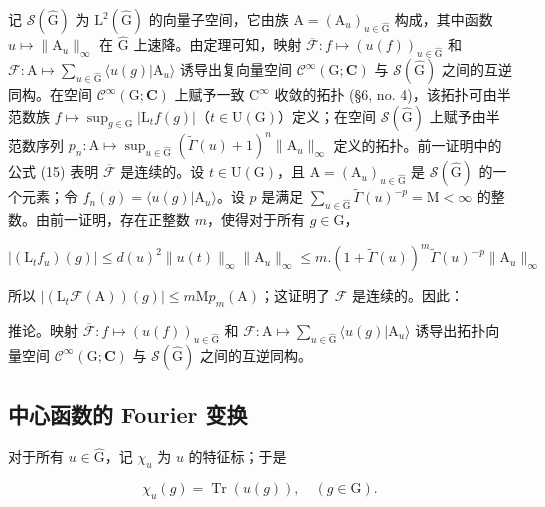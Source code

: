记 \(\mathcal{S}(\hat{\mathrm{G}})\) 为 \(\mathrm{L}^2 (\hat{\mathrm{G}})\) 的向量子空间，它由族 \(\mathrm{A} = (\mathrm{A}_u)_{u\in \hat{\mathrm{G}}}\) 构成，其中函数 \(u\mapsto \| \mathrm{A}_u\|_\infty\) 在 \(\hat{\mathrm{G}}\) 上速降。由定理可知，映射 \(\overline{\mathcal{F}}:f\mapsto (u(f))_{u\in \hat{\mathrm{G}}}\) 和 \(\mathcal{F}\colon \mathrm{A}\mapsto \sum_{u\in \hat{\mathrm{G}}}\langle u(g)|\mathrm{A}_u\rangle\) 诱导出复向量空间 \(\mathcal{C}^\infty (\mathrm{G};\mathbf{C})\) 与 \(\mathcal{S}(\hat{\mathrm{G}})\) 之间的互逆同构。在空间 \(\mathcal{C}^\infty (\mathrm{G};\mathbf{C})\) 上赋予一致 \(\mathrm{C}^\infty\) 收敛的拓扑 (§6, no. 4)，该拓扑可由半范数族 \(f\mapsto \sup_{g\in \mathrm{G}}|\mathrm{L}_t f(g)|\)（\(t\in \mathrm{U}(\mathrm{G})\)）定义；在空间 \(\mathcal{S}(\hat{\mathrm{G}})\) 上赋予由半范数序列 \(p_n:\mathrm{A}\mapsto \sup_{u\in \hat{\mathrm{G}}}(\tilde{\Gamma} (u) + 1)^n\| \mathrm{A}_u\|_\infty\) 定义的拓扑。前一证明中的公式 (15) 表明 \(\overline{\mathcal{F}}\) 是连续的。设 \(t\in \mathrm{U}(\mathrm{G})\)，且 \(\mathrm{A} = (\mathrm{A}_u)_{u\in \hat{\mathrm{G}}}\) 是 \(\mathcal{S}(\hat{\mathrm{G}})\) 的一个元素；令 \(f_{n}(g) = \langle u(g)|\mathrm{A}_{u}\rangle\)。设 \(p\) 是满足 \(\sum_{u\in \hat{\mathrm{G}}} \tilde{\Gamma} (u)^{-p} = \mathrm{M} < \infty\) 的整数。由前一证明，存在正整数 \(m\)，使得对于所有 \(g\in \mathrm{G}\)，

\[
| (\mathrm{L} _ {t} f _ {u}) (g) | \leq d (u) ^ {2} \| u (t) \| _ {\infty} \| \mathrm{A} _ {u} \| _ {\infty} \leq m. (1 + \tilde {\Gamma} (u)) ^ {m} \tilde {\Gamma} (u) ^ {- p} \| \mathrm{A} _ {u} \| _ {\infty}
\]

所以 \(|(\mathrm{L}_t\mathcal{F}(\mathrm{A}))(g)| \leq m\mathrm{M}p_m(\mathrm{A})\)；这证明了 \(\mathcal{F}\) 是连续的。因此：

推论。映射 \(\overline{\mathcal{F}}: f \mapsto (u(f))_{u \in \hat{\mathrm{G}}} \text{ 和 } \mathcal{F}: \mathrm{A} \mapsto \sum_{u \in \hat{\mathrm{G}}} \langle u(g) | \mathrm{A}_u \rangle\) 诱导出拓扑向量空间 \(\mathcal{C}^\infty(\mathrm{G}; \mathbf{C})\) 与 \(\mathcal{S}(\hat{\mathrm{G}})\) 之间的互逆同构。

\subsection{中心函数的 Fourier 变换}

对于所有 \(u \in \hat{\mathrm{G}}\)，记 \(\chi_u\) 为 \(u\) 的特征标；于是

\[
\chi_ {u} (g) = \operatorname{Tr} (u (g)), \quad (g \in \mathrm{G}).\tag{16}
\]

